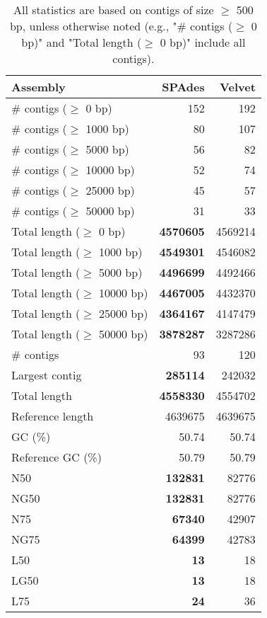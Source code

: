 \documentclass[12pt,a4paper]{article}
\begin{document}
\begin{table}[ht]
\begin{center}
\caption{All statistics are based on contigs of size $\geq$ 500 bp, unless otherwise noted (e.g., "\# contigs ($\geq$ 0 bp)" and "Total length ($\geq$ 0 bp)" include all contigs).}
\begin{tabular}{|l*{2}{|r}|}
\hline
Assembly & SPAdes & Velvet \\ \hline
\# contigs ($\geq$ 0 bp) & 152 & 192 \\ \hline
\# contigs ($\geq$ 1000 bp) & 80 & 107 \\ \hline
\# contigs ($\geq$ 5000 bp) & 56 & 82 \\ \hline
\# contigs ($\geq$ 10000 bp) & 52 & 74 \\ \hline
\# contigs ($\geq$ 25000 bp) & 45 & 57 \\ \hline
\# contigs ($\geq$ 50000 bp) & 31 & 33 \\ \hline
Total length ($\geq$ 0 bp) & {\bf 4570605} & 4569214 \\ \hline
Total length ($\geq$ 1000 bp) & {\bf 4549301} & 4546082 \\ \hline
Total length ($\geq$ 5000 bp) & {\bf 4496699} & 4492466 \\ \hline
Total length ($\geq$ 10000 bp) & {\bf 4467005} & 4432370 \\ \hline
Total length ($\geq$ 25000 bp) & {\bf 4364167} & 4147479 \\ \hline
Total length ($\geq$ 50000 bp) & {\bf 3878287} & 3287286 \\ \hline
\# contigs & 93 & 120 \\ \hline
Largest contig & {\bf 285114} & 242032 \\ \hline
Total length & {\bf 4558330} & 4554702 \\ \hline
Reference length & 4639675 & 4639675 \\ \hline
GC (\%) & 50.74 & 50.74 \\ \hline
Reference GC (\%) & 50.79 & 50.79 \\ \hline
N50 & {\bf 132831} & 82776 \\ \hline
NG50 & {\bf 132831} & 82776 \\ \hline
N75 & {\bf 67340} & 42907 \\ \hline
NG75 & {\bf 64399} & 42783 \\ \hline
L50 & {\bf 13} & 18 \\ \hline
LG50 & {\bf 13} & 18 \\ \hline
L75 & {\bf 24} & 36 \\ \hline

\end{tabular}
\end{center}
\end{table}
\end{document}
